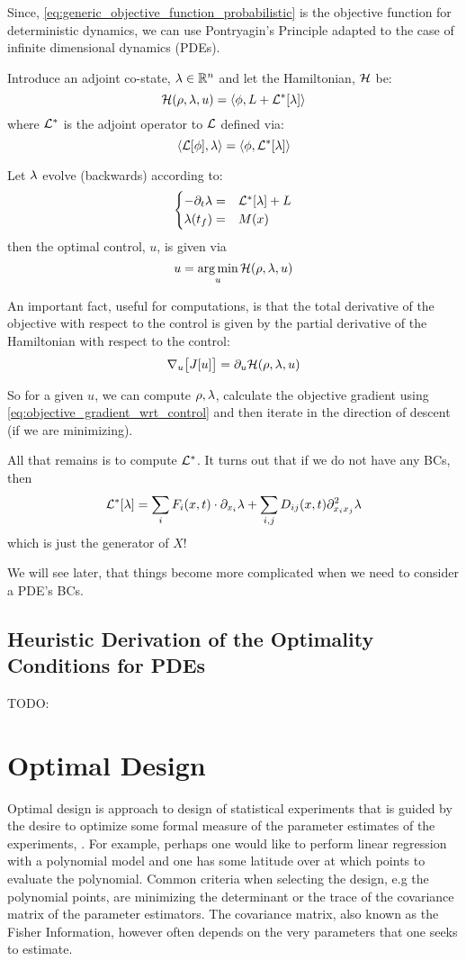 Since, \cref{eq:generic_objective_function_probabilistic} is the objective
function for deterministic dynamics, we can use Pontryagin's Principle adapted
to the case of infinite dimensional dynamics (PDEs). 

Introduce an adjoint co-state, ${\lambda} \in { \mathbb{R} }^n$ and let the Hamiltonian, ${ \mathcal{H} }$ be:
$$
{ \mathcal{H} }({\rho}, {\lambda}, u)= \langle \phi, L + { { \mathcal{L} }^* }[{\lambda}] \rangle$$
where ${ { \mathcal{L} }^* }$ is the adjoint operator to ${ \mathcal{L} }$ defined via:
$$
\langle { \mathcal{L} } [\phi], {\lambda} \rangle =\langle \phi, { { \mathcal{L} }^* }[{\lambda}] \rangle
$$

Let ${\lambda}$ evolve (backwards) according to:
\begin{equation*}
\begin{cases}
-{\partial}_t {\lambda} =& { { \mathcal{L} }^* }[{\lambda}] + L
\\
{\lambda}({ t_f }) =& M(x)  
\end{cases}
\end{equation*}
then the optimal control, $u$, is given via
$$
u = \argmin_u {\H(\f, \l, u)}
$$   

An important fact, useful for computations, is that the total derivative of the
objective with respect to the control is given by the partial derivative of the
Hamiltonian with respect to the control:
\begin{equation}
{ \nabla }_u \big[J[u] \big] = {\partial}_u { \mathcal{H} }({\rho}, {\lambda}, u)
\label{eq:objective_gradient_wrt_control}
\end{equation}

So for a given $u$, we can compute ${\rho},{\lambda}$, calculate the objective gradient
using \cref{eq:objective_gradient_wrt_control} and then iterate in the direction
of descent (if we are minimizing).

All that remains is to compute ${ { \mathcal{L} }^* }$. It turns out that if we do not have any
BCs, then
$$
{ { \mathcal{L} }^* }[{\lambda}] = \sum_i F_i(x,t) \cdot {\partial}_{x_i} {\lambda} + \sum_{i,j} D_{ij}(x,t)
{\partial}^2_{x_i x_j}{\lambda} 
$$ 
which is just the generator of $X$! 

We will see later, that things become more complicated when we need to
consider a PDE's BCs.

 
\subsection{Heuristic Derivation of the Optimality Conditions for PDEs}
\label{sec:Pontryagin_heuristic_derivation}
TODO: \cite{Borzi2012,Lenhart2007}

\section{Optimal Design}
\label{sec:optimal_design}
Optimal design is approach to design of statistical experiments that is guided
by the desire to optimize some formal measure of the parameter estimates of the
experiments, \cite{Pukelsheim2006}. For example, perhaps one would like to
perform linear regression with a polynomial model and one has some latitude over
at which points to evaluate the polynomial. Common criteria when selecting the
design, e.g the polynomial points, are minimizing the determinant or the trace
of the covariance matrix of the parameter estimators. The covariance matrix,
also known as the Fisher Information, however often depends on the very
parameters that one seeks to estimate.


